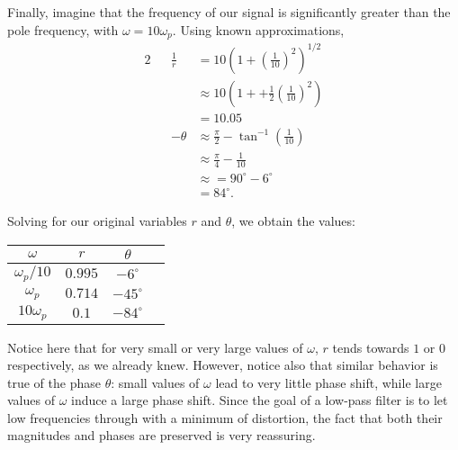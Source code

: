 \documentclass[letterpaper]{article}
\theoremstyle{remark}
\newcommand{\eqn}[1]{\begin{alignat*}{2}#1\end{alignat*}}
\begin{document}
Finally, imagine that the frequency of our signal is significantly greater than the pole frequency, with $\omega = 10\omega_p$. Using known approximations,
\eqn{
    && \frac{1}{r} &= 10\left(1 + \left(\frac{1}{10}\right)^2\right)^{1/2} \\
    &&&\approx 10\left(1 + + \frac{1}{2} \left(\frac{1}{10} \right)^2 \right) \\
    &&&= 10.05 \\
    && -\theta &\approx \frac{\pi}{2} - \tan^{-1}\left(\frac{1}{10}\right) \\
    &&&\approx \frac{\pi}{4} - \frac{1}{10} \\
    &&&\approx= 90^{\circ} - 6^{\circ} \\
    &&&= 84^{\circ}.
}

Solving for our original variables $r$ and $\theta$, we obtain the values:
\begin{table}[H]
\centering
\begin{tabular}{|c|c|c|c|}
\hline
$\omega$ & $r$ & $\theta$ \\ \hline
$\omega_p / 10$ & $0.995$ & $-6^{\circ}$ \\ \hline
$\omega_p$ & $0.714$ & $-45^{\circ}$ \\ \hline
$10\omega_p$ & $0.1$ & $-84^{\circ}$ \\ \hline
\end{tabular}
\end{table}

Notice here that for very small or very large values of $\omega$, $r$ tends towards $1$ or $0$ respectively, as we already knew. However, notice also that similar behavior is true of the phase $\theta$: small values of $\omega$ lead to very little phase shift, while large values of $\omega$ induce a large phase shift. Since the goal of a low-pass filter is to let low frequencies through with a minimum of distortion, the fact that both their magnitudes and phases are preserved is very reassuring.
\end{document}
